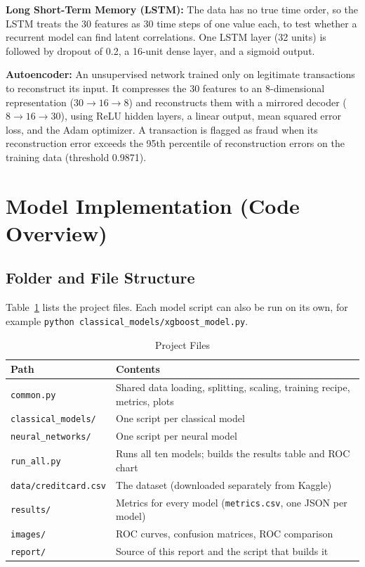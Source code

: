 \documentclass[journal]{IEEEtran}
\begin{document}
\textbf{Long Short-Term Memory (LSTM):} The data has no true time order, so the LSTM treats the 30 features as 30 time steps of one value each, to test whether a recurrent model can find latent correlations. One LSTM layer (32 units) is followed by dropout of 0.2, a 16-unit dense layer, and a sigmoid output.

\textbf{Autoencoder:} An unsupervised network trained only on legitimate transactions to reconstruct its input. It compresses the 30 features to an 8-dimensional representation ($30 \rightarrow 16 \rightarrow 8$) and reconstructs them with a mirrored decoder ($8 \rightarrow 16 \rightarrow 30$), using ReLU hidden layers, a linear output, mean squared error loss, and the Adam optimizer. A transaction is flagged as fraud when its reconstruction error exceeds the 95th percentile of reconstruction errors on the training data (threshold 0.9871).

\section{Model Implementation (Code Overview)}
\subsection{Folder and File Structure}
Table~\ref{tab:files} lists the project files. Each model script can also be run on its own, for example \texttt{python classical\_models/xgboost\_model.py}.

\begin{table}[!t]
\centering
\caption{Project Files}
\label{tab:files}
\footnotesize
\begin{tabular}{@{}p{}p{}@{}}
\toprule
Path & Contents \\
\midrule
\texttt{common.py} & Shared data loading, splitting, scaling, training recipe, metrics, plots \\
\texttt{classical\_models/} & One script per classical model \\
\texttt{neural\_networks/} & One script per neural model \\
\texttt{run\_all.py} & Runs all ten models; builds the results table and ROC chart \\
\texttt{data/creditcard.csv} & The dataset (downloaded separately from Kaggle) \\
\texttt{results/} & Metrics for every model (\texttt{metrics.csv}, one JSON per model) \\
\texttt{images/} & ROC curves, confusion matrices, ROC comparison \\
\texttt{report/} & Source of this report and the script that builds it \\
\bottomrule
\end{tabular}
\end{table}
\end{document}
